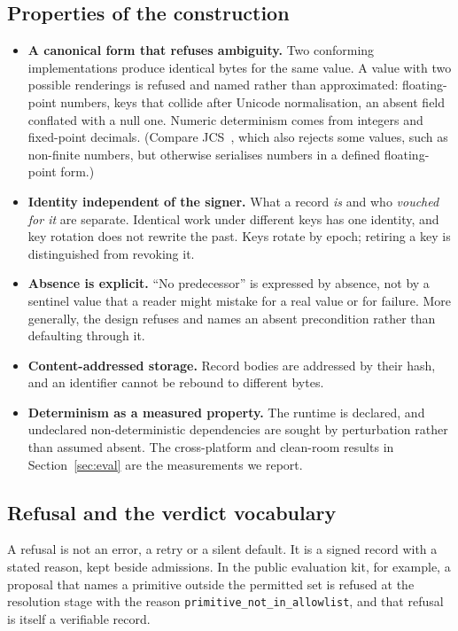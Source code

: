 \documentclass[11pt,a4paper]{article}
\begin{document}
\subsection{Properties of the construction}

\begin{itemize}
  \item \textbf{A canonical form that refuses ambiguity.} Two conforming implementations produce identical bytes for the same value. A value with two possible renderings is refused and named rather than approximated: floating-point numbers, keys that collide after Unicode normalisation, an absent field conflated with a null one. Numeric determinism comes from integers and fixed-point decimals. (Compare JCS~\citep{rfc8785}, which also rejects some values, such as non-finite numbers, but otherwise serialises numbers in a defined floating-point form.)
  \item \textbf{Identity independent of the signer.} What a record \emph{is} and who \emph{vouched for it} are separate. Identical work under different keys has one identity, and key rotation does not rewrite the past. Keys rotate by epoch; retiring a key is distinguished from revoking it.
  \item \textbf{Absence is explicit.} ``No predecessor'' is expressed by absence, not by a sentinel value that a reader might mistake for a real value or for failure. More generally, the design refuses and names an absent precondition rather than defaulting through it.
  \item \textbf{Content-addressed storage.} Record bodies are addressed by their hash, and an identifier cannot be rebound to different bytes.
  \item \textbf{Determinism as a measured property.} The runtime is declared, and undeclared non-deterministic dependencies are sought by perturbation rather than assumed absent. The cross-platform and clean-room results in Section~\ref{sec:eval} are the measurements we report.
\end{itemize}

\subsection{Refusal and the verdict vocabulary}\label{sec:verdicts}

A refusal is not an error, a retry or a silent default. It is a signed record with a stated reason, kept beside admissions. In the public evaluation kit, for example, a proposal that names a primitive outside the permitted set is refused at the resolution stage with the reason \texttt{primitive\_not\_in\_allowlist}, and that refusal is itself a verifiable record.
\end{document}
